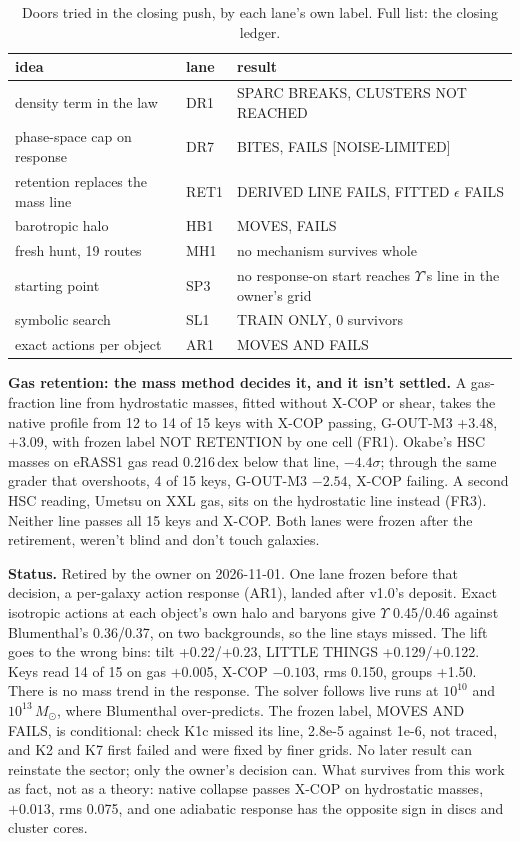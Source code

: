 \documentclass[10pt]{article}
\begin{document}
\begin{table}[h]\centering\small
\caption{Doors tried in the closing push, by each lane's own label. Full list: the closing ledger.}
\begin{tabular}{>{\raggedright\arraybackslash}p{5.6cm}l>{\raggedright\arraybackslash}p{7.2cm}}
\toprule
idea & lane & result\\
\midrule
density term in the law & DR1 & SPARC BREAKS, CLUSTERS NOT REACHED\\
phase-space cap on response & DR7 & BITES, FAILS [NOISE-LIMITED]\\
retention replaces the mass line & RET1 & DERIVED LINE FAILS, FITTED $\epsilon$ FAILS\\
barotropic halo & HB1 & MOVES, FAILS\\
fresh hunt, 19 routes & MH1 & no mechanism survives whole\\
starting point & SP3 & no response-on start reaches $\Upsilon$'s line in the owner's grid\\
symbolic search & SL1 & TRAIN ONLY, 0 survivors\\
exact actions per object & AR1 & MOVES AND FAILS\\
\bottomrule
\end{tabular}
\end{table}
\textbf{Gas retention: the mass method decides it, and it isn't settled.} A gas-fraction line from hydrostatic masses, fitted without X-COP or shear, takes the native profile from 12 to 14 of 15 keys with X-COP passing, G-OUT-M3 +3.48, +3.09, with frozen label NOT RETENTION by one cell (FR1). Okabe's HSC masses on eRASS1 gas read 0.216\,dex below that line, $-4.4\sigma$; through the same grader that overshoots, 4 of 15 keys, G-OUT-M3 $-2.54$, X-COP failing. A second HSC reading, Umetsu on XXL gas, sits on the hydrostatic line instead (FR3). Neither line passes all 15 keys and X-COP. Both lanes were frozen after the retirement, weren't blind and don't touch galaxies.

\textbf{Status.} Retired by the owner on 2026-11-01. One lane frozen before that decision, a per-galaxy action response (AR1), landed after v1.0's deposit. Exact isotropic actions at each object's own halo and baryons give $\Upsilon$ 0.45/0.46 against Blumenthal's 0.36/0.37, on two backgrounds, so the line stays missed. The lift goes to the wrong bins: tilt +0.22/+0.23, LITTLE THINGS +0.129/+0.122. Keys read 14 of 15 on gas +0.005, X-COP $-0.103$, rms 0.150, groups +1.50. There is no mass trend in the response. The solver follows live runs at $10^{10}$ and $10^{13}\,M_\odot$, where Blumenthal over-predicts. The frozen label, MOVES AND FAILS, is conditional: check K1c missed its line, 2.8e-5 against 1e-6, not traced, and K2 and K7 first failed and were fixed by finer grids. No later result can reinstate the sector; only the owner's decision can. What survives from this work as fact, not as a theory: native collapse passes X-COP on hydrostatic masses, $+0.013$, rms 0.075, and one adiabatic response has the opposite sign in discs and cluster cores.
\end{document}
